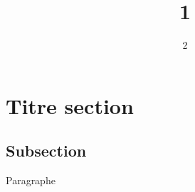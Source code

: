 \documentclass{animation-fablab}
\title{1}
\author{2}
\begin{document}
  \maketitle

  \section{Titre section}
  \subsection{Subsection}
  {Paragraphe}
\end{document}
